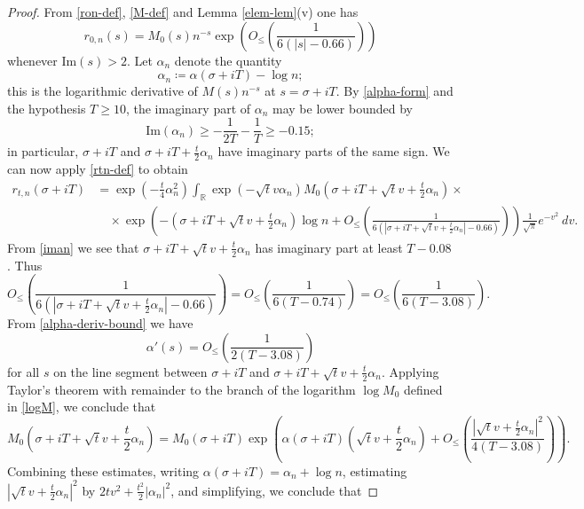 \documentclass[a4paper,11pt,twoside]{amsart}
\newcommand\R{\mathbb{R}}
\begin{document}
\begin{proof}  From \eqref{ron-def}, \eqref{M-def} and Lemma \ref{elem-lem}(v) one has
$$ 
r_{0,n}(s) = M_0(s) n^{-s} \exp\left( O_{\leq}\left( \frac{1}{6(|s|-0.66)} \right) \right)
$$
whenever $\mathrm{Im}(s) > 2$.  Let $\alpha_n$ denote the quantity
\begin{equation}\label{alphan-def}
\alpha_n \coloneqq \alpha(\sigma+iT) - \log n;
\end{equation}
this is the logarithmic derivative of $M(s) n^{-s}$ at $s=\sigma+iT$.  
By \eqref{alpha-form} and the hypothesis $T \geq 10$, the imaginary part of $\alpha_n$ may be lower bounded by
\begin{equation}\label{iman}
 \mathrm{Im}(\alpha_n) \geq -\frac{1}{2T} - \frac{1}{T} \geq -0.15;
\end{equation}
in particular, $\sigma+iT$ and $\sigma+iT+\frac{t}{2}\alpha_n$ have imaginary parts of the same sign.
We can now apply \eqref{rtn-def} to obtain
\begin{align*}
 r_{t,n}(\sigma+iT) &= \exp\left( - \frac{t}{4} \alpha_n^2\right) \int_\R \exp\left( - \sqrt{t} v \alpha_n\right) M_0\left( \sigma + iT + \sqrt{t} v + \frac{t}{2} \alpha_n\right) \times \\
&\quad \times \exp\left( -\left(\sigma+iT+\sqrt{t} v + \frac{t}{2} \alpha_n \right) \log n + O_{\leq}\left( \frac{1}{6(|\sigma+iT+\sqrt{t} v + \frac{t}{2} \alpha_n|-0.66)} \right) \right)
\frac{1}{\sqrt{\pi}} e^{-v^2}\ dv.
\end{align*}
From \eqref{iman} we see that $\sigma+iT+\sqrt{t}v+\frac{t}{2}\alpha_n$ has imaginary part at least $T-0.08$. Thus
$$ O_{\leq}\left( \frac{1}{6(|\sigma+iT+\sqrt{t} v + \frac{t}{2} \alpha_n|-0.66)} \right)  = 
O_{\leq}\left( \frac{1}{6(T - 0.74)} \right) = O_{\leq}\left( \frac{1}{6(T - 3.08)} \right).$$
From \eqref{alpha-deriv-bound} we have
$$ \alpha'(s) = O_{\leq}\left( \frac{1}{2(T-3.08)} \right)$$
for all $s$ on the line segment between $\sigma+iT$ and $\sigma + iT + \sqrt{t} v + \frac{t}{2} \alpha_n$.  Applying Taylor's theorem with remainder to the branch of the logarithm $\log M_0$ defined in \eqref{logM}, we conclude that
$$ M_0( \sigma + iT + \sqrt{t} v + \frac{t}{2} \alpha_n) = M_0(\sigma+iT) \exp\left( \alpha(\sigma+iT) (\sqrt{t} v + \frac{t}{2} \alpha_n) + O_{\leq}\left( \frac{|\sqrt{t} v + \frac{t}{2} \alpha_n|^2}{4(T-3.08)}  \right)\right).$$
Combining these estimates, writing $\alpha(\sigma+iT) = \alpha_n + \log n$, estimating $|\sqrt{t} v + \frac{t}{2} \alpha_n|^2$ by $2tv^2 + \frac{t^2}{2} |\alpha_n|^2$, and simplifying, we conclude that

\end{proof}
\end{document}
